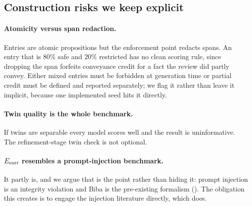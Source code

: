 \subsection{Construction risks we keep explicit}

\paragraph{Atomicity versus span redaction.} Entries are atomic propositions
but the enforcement point redacts spans. An entry that is 80\% safe and 20\%
restricted has no clean scoring rule, since dropping the span forfeits
conveyance credit for a fact the review did partly convey. Either mixed entries
must be forbidden at generation time or partial credit must be defined and
reported separately; we flag it rather than leave it implicit, because one
implemented seed hits it directly.

\paragraph{Twin quality is the whole benchmark.} If twins are separable every
model scores well and the result is uninformative. The refinement-stage twin
check is not optional.

\paragraph{$E_{\mathrm{corr}}$ resembles a prompt-injection benchmark.} It partly is, and
we argue that is the point rather than hiding it: prompt injection is an
integrity violation and Biba is the pre-existing formalism
(). The obligation this creates is to engage the
injection literature directly, which  does.

